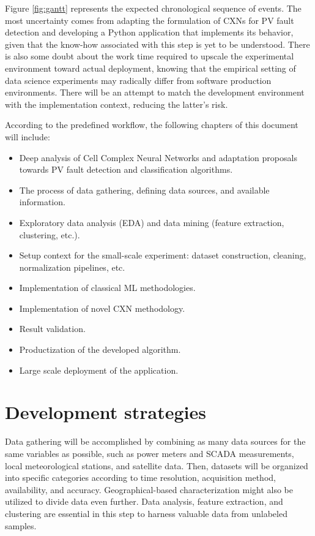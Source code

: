 Figure \ref{fig:gantt} represents the expected chronological sequence of events. The most uncertainty comes from adapting the formulation of CXNs for PV fault detection and developing a Python application that implements its behavior, given that the know-how associated with this step is yet to be understood. There is also some doubt about the work time required to upscale the experimental environment toward actual deployment, knowing that the empirical setting of data science experiments may radically differ from software production environments. There will be an attempt to match the development environment with the implementation context, reducing the latter's risk.

According to the predefined workflow, the following chapters of this document will include:

\begin{itemize}
    \item Deep analysis of Cell Complex Neural Networks and adaptation proposals towards PV fault detection and classification algorithms.
    \item The process of data gathering, defining data sources, and available information.
    \item Exploratory data analysis (EDA) and data mining (feature extraction, clustering, etc.).
    \item Setup context for the small-scale experiment: dataset construction, cleaning, normalization pipelines, etc.
    \item Implementation of classical ML methodologies.
    \item Implementation of novel CXN methodology.
    \item Result validation.
    \item Productization of the developed algorithm.
    \item Large scale deployment of the application.
\end{itemize}

\section{Development strategies}

Data gathering will be accomplished by combining as many data sources for the same variables as possible, such as power meters and SCADA measurements, local meteorological stations, and satellite data. Then, datasets will be organized into specific categories according to time resolution, acquisition method, availability, and accuracy. Geographical-based characterization might also be utilized to divide data even further. Data analysis, feature extraction, and clustering are essential in this step to harness valuable data from unlabeled samples.

